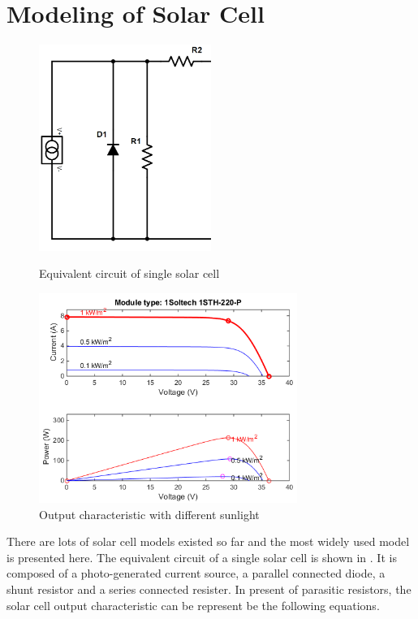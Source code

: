\section{Modeling of Solar Cell}\label{sec:solar_cell}
\begin{figure}[b]
\begin{minipage}{.5\textwidth}
    \centering
    \includegraphics[width = 0.5\textwidth]{figures/cell_equal.png}
    \caption{Equivalent circuit of single solar cell}
    \label{fig:cell equivalent}	
\end{minipage}
\begin{minipage}{.5\textwidth}
    \centering
    \includegraphics[width = 0.75\textwidth]{figures/typical_solar.png}
    \caption{Output characteristic with different sunlight}
    \label{fig:typical solar module}	
\end{minipage}
\end{figure}
There are lots of solar cell models existed so far and the most widely used model is presented here. The equivalent circuit of a single solar cell is shown in . It is composed of a photo-generated current source, a parallel connected diode, a shunt resistor and a series connected resister\cite{wenham2007applied}. In present of parasitic resistors, the solar cell output characteristic can be represent be the following equations\cite{RN24}\cite{RN26}. 
